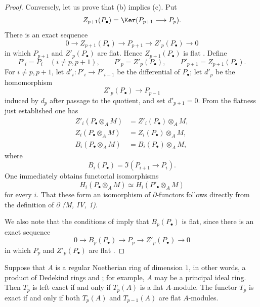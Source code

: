 \begin{proof}
Conversely, let us prove that (b) implies (c).  Put
\[
  Z_{p+1}(P_\bullet)
  =
  \Ker(P_{p+1}\longrightarrow P_p).
\]
There is an exact sequence
\[
  0
  \longrightarrow Z_{p+1}(P_\bullet)
  \longrightarrow P_{p+1}
  \longrightarrow Z'_p(P_\bullet)
  \longrightarrow 0
\]
in which $P_{p+1}$ and $Z'_p(P_\bullet)$ are flat.  Hence
$Z_{p+1}(P_\bullet)$ is flat .  Define
\[
  P'_i=P_i\quad(i\neq p,p+1),\qquad
  P'_p=Z'_p(P_\bullet),\qquad
  P'_{p+1}=Z_{p+1}(P_\bullet).
\]
For $i\neq p,p+1$, let $d'_i:P'_i\to P'_{i-1}$ be the
differential of $P_\bullet$; let $d'_p$ be the homomorphism
\[
  Z'_p(P_\bullet)\longrightarrow P_{p-1}
\]
induced by $d_p$ after passage to the quotient, and set
$d'_{p+1}=0$.  From the flatness just established one has
\[
\begin{split}
  Z'_i(P_\bullet\otimes_A M)
    &=Z'_i(P_\bullet)\otimes_A M,\\
  Z_i(P_\bullet\otimes_A M)
    &=Z_i(P_\bullet)\otimes_A M,\\
  B_i(P_\bullet\otimes_A M)
    &=B_i(P_\bullet)\otimes_A M,
\end{split}
\]
where
\[
  B_i(P_\bullet)=\Im(P_{i+1}\longrightarrow P_i).
\]
One immediately obtains functorial isomorphisms
\[
  H_i(P_\bullet\otimes_A M)
  \simeq
  H_i(P'_\bullet\otimes_A M)
\]
for every $i$.  That these form an isomorphism of
$\partial$-functors follows directly from the definition of
$\partial$ \emph{(M, IV, 1)}.

We also note that the conditions of  imply
that $B_p(P_\bullet)$ is flat, since there is an exact sequence
\[
  0
  \longrightarrow B_p(P_\bullet)
  \longrightarrow P_p
  \longrightarrow Z'_p(P_\bullet)
  \longrightarrow 0
\]
in which $P_p$ and $Z'_p(P_\bullet)$ are flat
.
\end{proof}

\begin{corollary}[7.4.3]
\label{III.7.4.3}
Suppose that $A$ is a regular Noetherian ring of dimension
$1$, in other words, a product of Dedekind rings
 and ; for example, $A$
may be a principal ideal ring.  Then $T_p$ is left exact if
and only if $T_p(A)$ is a flat $A$-module.  The functor $T_p$
is exact if and only if both $T_p(A)$ and $T_{p-1}(A)$ are
flat $A$-modules.
\end{corollary}

